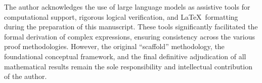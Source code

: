 \documentclass[12pt,a4paper]{article}
\theoremstyle{plain}
\theoremstyle{definition}
\theoremstyle{remark}
\begin{document}
The author acknowledges the use of large language models as assistive tools for computational support, rigorous logical verification, and \LaTeX\ formatting during the preparation of this manuscript. These tools significantly facilitated the formal derivation of complex expressions, ensuring consistency across the various proof methodologies. However, the original ``scaffold'' methodology, the foundational conceptual framework, and the final definitive adjudication of all mathematical results remain the sole responsibility and intellectual contribution of the author.



\end{document}
